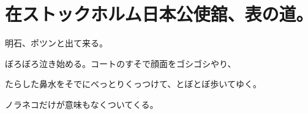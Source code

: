 \section*{在ストックホルム日本公使舘、表の道。}

明石、ポツンと出て来る。

ぼろぼろ泣き始める。コートのすそで顔面をゴシゴシやり、

たらした鼻水をそでにべっとりくっつけて、とぼとぼ歩いてゆく。

ノラネコだけが意味もなくついてくる。
